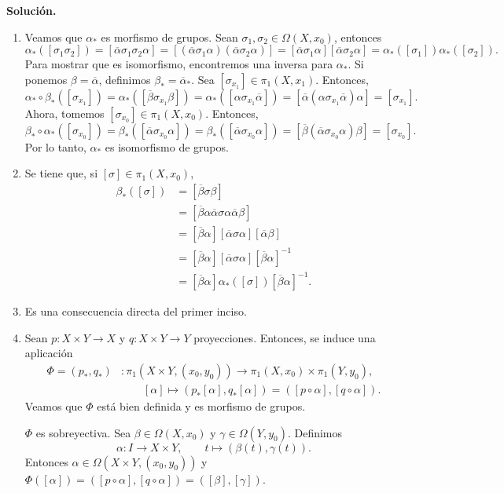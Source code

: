 \documentclass[11pt,a4paper]{article}
\theoremstyle{plain}
\theoremstyle{definition}
\theoremstyle{remark}
\begin{document}
\begin{enumerate}[label=\arabic*.,leftmargin=*]
\noindent\textbf{Solución.}
\begin{enumerate}[label=\alph*)]
\item Veamos que $\alpha_*$ es morfismo de grupos. Sean
$\sigma_1,\sigma_2\in\Omega(X,x_0)$, entonces
\[
\alpha_*([\sigma_1\sigma_2])=[\overline\alpha\sigma_1\sigma_2\alpha]
=[(\overline\alpha\sigma_1\alpha)(\overline\alpha\sigma_2\alpha)]
=[\overline\alpha\sigma_1\alpha][\overline\alpha\sigma_2\alpha]
=\alpha_*([\sigma_1])\alpha_*([\sigma_2]).
\]
Para mostrar que es isomorfismo, encontremos una inversa para $\alpha_*$.
Si ponemos $\beta=\overline\alpha$, definimos $\beta_*=\overline\alpha_*$. Sea
$[\sigma_{x_1}]\in\pi_1(X,x_1)$. Entonces,
\[
\alpha_*\circ\beta_*([\sigma_{x_1}])=\alpha_*([\overline\beta\sigma_{x_1}\beta])
=\alpha_*([\alpha\sigma_{x_1}\overline\alpha])
=[\overline\alpha(\alpha\sigma_{x_1}\overline\alpha)\alpha]
=[\sigma_{x_1}].
\]
Ahora, tomemos $[\sigma_{x_0}]\in\pi_1(X,x_0)$. Entonces,
\[
\beta_*\circ\alpha_*([\sigma_{x_0}])=\beta_*([\overline\alpha\sigma_{x_0}\alpha])
=\beta_*([\overline\alpha\sigma_{x_0}\alpha])
=[\overline\beta(\overline\alpha\sigma_{x_0}\alpha)\beta]
=[\sigma_{x_0}].
\]
Por lo tanto, $\alpha_*$ es isomorfismo de grupos.
\item Se tiene que, si $[\sigma]\in\pi_1(X,x_0)$,
\[
\begin{aligned}
\beta_*([\sigma])&=[\overline\beta\sigma\beta]\\
&=[\overline\beta\alpha\overline\alpha\sigma\alpha\overline\alpha\beta]\\
&=[\overline\beta\alpha][\overline\alpha\sigma\alpha][\overline\alpha\beta]\\
&=[\overline\beta\alpha][\overline\alpha\sigma\alpha][\overline\beta\alpha]^{-1}\\
&=[\overline\beta\alpha]\alpha_*([\sigma])[\overline\beta\alpha]^{-1}.
\end{aligned}
\]
\item Es una consecuencia directa del primer inciso.
\item Sean $p:X\times Y\to X$ y $q:X\times Y\to Y$ proyecciones. Entonces,
se induce una aplicación
\[
\begin{aligned}
\Phi=(p_*,q_*)&:\pi_1(X\times Y,(x_0,y_0))\to\pi_1(X,x_0)\times\pi_1(Y,y_0),\\
&\qquad [\alpha]\mapsto(p_*[\alpha],q_*[\alpha])=([p\circ\alpha],[q\circ\alpha]).
\end{aligned}
\]
Veamos que $\Phi$ está bien definida y es morfismo de grupos.

$\Phi$ es sobreyectiva. Sea $\beta\in\Omega(X,x_0)$ y $\gamma\in\Omega(Y,y_0)$.
Definimos
\[
\alpha:I\to X\times Y, \qquad t\mapsto(\beta(t),\gamma(t)).
\]
Entonces $\alpha\in\Omega(X\times Y,(x_0,y_0))$ y
$\Phi([\alpha])=([p\circ\alpha],[q\circ\alpha])=([\beta],[\gamma])$.


\end{enumerate}
\end{enumerate}
\end{document}
